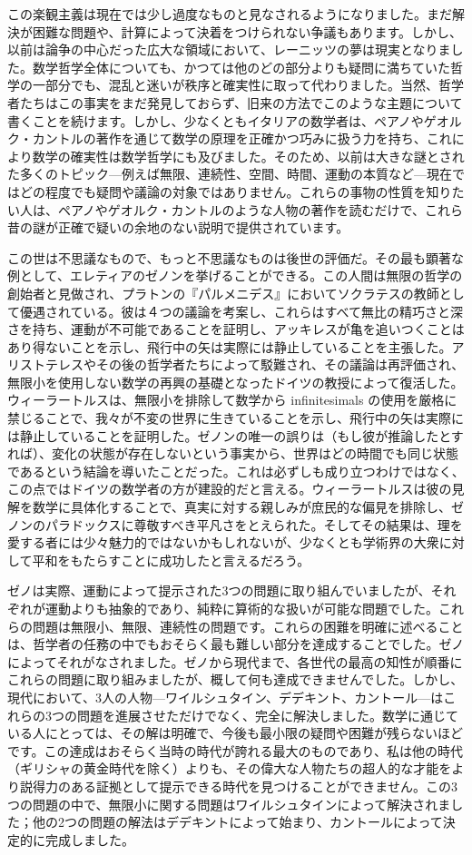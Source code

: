 \documentclass[a4paper,11pt,openany]{ltjsbook}
\begin{document}
この楽観主義は現在では少し過度なものと見なされるようになりました。まだ解決が困難な問題や、計算によって決着をつけられない争議もあります。しかし、以前は論争の中心だった広大な領域において、レーニッツの夢は現実となりました。数学哲学全体についても、かつては他のどの部分よりも疑問に満ちていた哲学の一部分でも、混乱と迷いが秩序と確実性に取って代わりました。当然、哲学者たちはこの事実をまだ発見しておらず、旧来の方法でこのような主題について書くことを続けます。しかし、少なくともイタリアの数学者は、ペアノやゲオルク・カントルの著作を通じて数学の原理を正確かつ巧みに扱う力を持ち、これにより数学の確実性は数学哲学にも及びました。そのため、以前は大きな謎とされた多くのトピック—例えば無限、連続性、空間、時間、運動の本質など—現在ではどの程度でも疑問や議論の対象ではありません。これらの事物の性質を知りたい人は、ペアノやゲオルク・カントルのような人物の著作を読むだけで、これら昔の謎が正確で疑いの余地のない説明で提供されています。

この世は不思議なもので、もっと不思議なものは後世の評価だ。その最も顕著な例として、エレティアのゼノンを挙げることができる。この人間は無限の哲学の創始者と見做され、プラトンの『パルメニデス』においてソクラテスの教師として優遇されている。彼は４つの議論を考案し、これらはすべて無比の精巧さと深さを持ち、運動が不可能であることを証明し、アッキレスが亀を追いつくことはあり得ないことを示し、飛行中の矢は実際には静止していることを主張した。アリストテレスやその後の哲学者たちによって駁難され、その議論は再評価され、無限小を使用しない数学の再興の基礎となったドイツの教授によって復活した。ウィーラートルスは、無限小を排除して数学から infinitesimals の使用を厳格に禁じることで、我々が不変の世界に生きていることを示し、飛行中の矢は実際には静止していることを証明した。ゼノンの唯一の誤りは（もし彼が推論したとすれば）、変化の状態が存在しないという事実から、世界はどの時間でも同じ状態であるという結論を導いたことだった。これは必ずしも成り立つわけではなく、この点ではドイツの数学者の方が建設的だと言える。ウィーラートルスは彼の見解を数学に具体化することで、真実に対する親しみが庶民的な偏見を排除し、ゼノンのパラドックスに尊敬すべき平凡さをとえられた。そしてその結果は、理を愛する者には少々魅力的ではないかもしれないが、少なくとも学術界の大衆に対して平和をもたらすことに成功したと言えるだろう。

ゼノは実際、運動によって提示された3つの問題に取り組んでいましたが、それぞれが運動よりも抽象的であり、純粋に算術的な扱いが可能な問題でした。これらの問題は無限小、無限、連続性の問題です。これらの困難を明確に述べることは、哲学者の任務の中でもおそらく最も難しい部分を達成することでした。ゼノによってそれがなされました。ゼノから現代まで、各世代の最高の知性が順番にこれらの問題に取り組みましたが、概して何も達成できませんでした。しかし、現代において、3人の人物—ワイルシュタイン、デデキント、カントール—はこれらの3つの問題を進展させただけでなく、完全に解決しました。数学に通じている人にとっては、その解は明確で、今後も最小限の疑問や困難が残らないほどです。この達成はおそらく当時の時代が誇れる最大のものであり、私は他の時代（ギリシャの黄金時代を除く）よりも、その偉大な人物たちの超人的な才能をより説得力のある証拠として提示できる時代を見つけることができません。この3つの問題の中で、無限小に関する問題はワイルシュタインによって解決されました；他の2つの問題の解法はデデキントによって始まり、カントールによって決定的に完成しました。
\end{document}
